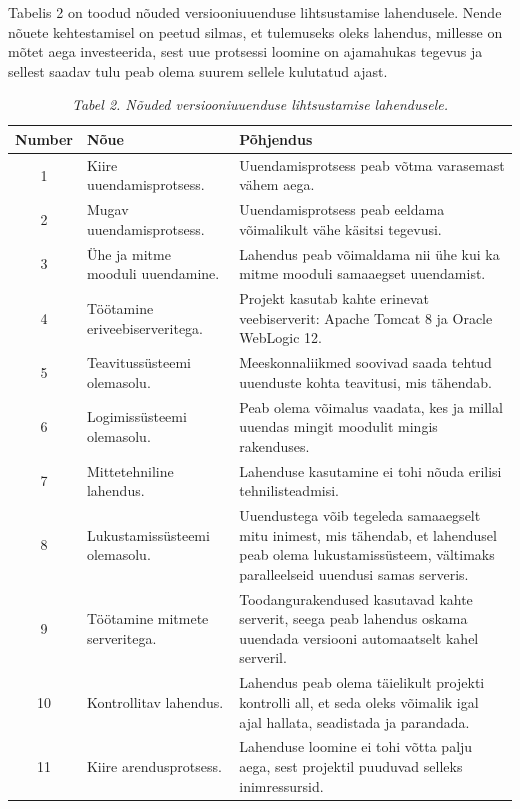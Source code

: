 \documentclass[12pt]{article}
\begin{document}
  Tabelis 2 on toodud nõuded versiooniuuenduse lihtsustamise lahendusele. Nende nõuete kehtestamisel on peetud silmas, et tulemuseks oleks lahendus, millesse on mõtet aega investeerida, sest uue protsessi loomine on ajamahukas tegevus ja sellest saadav tulu peab olema suurem sellele kulutatud ajast.
  
  \begin{table}[H]
    \caption*{\textit{Tabel 2. Nõuded versiooniuuenduse lihtsustamise lahendusele.}}
    
    \begin{tabular}{|c|p{3cm}|p{8cm}|}
      \hline
      \textbf{Number} & \textbf{Nõue} & \textbf{Põhjendus}\\
      \hline
      1 & Kiire uuendamisprotsess. & Uuendamisprotsess peab võtma varasemast vähem aega.\\
      \hline
      2 & Mugav uuendamisprotsess. & Uuendamisprotsess peab eeldama võimalikult vähe käsitsi tegevusi.\\
      \hline
      3 & Ühe ja mitme mooduli uuendamine. & Lahendus peab võimaldama nii ühe kui ka mitme mooduli samaaegset uuendamist.\\
      \hline
      4 & Töötamine eriveebiserveritega. & Projekt kasutab kahte erinevat veebiserverit: Apache Tomcat 8 ja Oracle WebLogic 12.\\
      \hline
      5 & Teavitussüsteemi olemasolu. & Meeskonnaliikmed soovivad saada tehtud uuenduste kohta teavitusi, mis tähendab.\\
      \hline
      6 & Logimissüsteemi olemasolu. & Peab olema võimalus vaadata, kes ja millal uuendas mingit moodulit mingis rakenduses.\\
      \hline
      7 & Mittetehniline lahendus. & Lahenduse kasutamine ei tohi nõuda erilisi tehnilisteadmisi.\\
      \hline
      8 & Lukustamis\-süsteemi olemasolu. & Uuendustega võib tegeleda samaaegselt mitu inimest, mis tähendab, et lahendusel peab olema lukustamissüsteem, vältimaks paralleelseid uuendusi samas serveris.\\
      \hline
      9 & Töötamine mitmete serveritega. & Toodangurakendused kasutavad kahte serverit, seega peab lahendus oskama uuendada versiooni automaatselt kahel serveril.\\
      \hline
      10 & Kontrollitav lahendus. & Lahendus peab olema täielikult projekti kontrolli all, et seda oleks võimalik igal ajal hallata, seadistada ja parandada.\\
      \hline
      11 & Kiire arendusprotsess. & Lahenduse loomine ei tohi võtta palju aega, sest projektil puuduvad selleks inimressursid.\\

\end{tabular}
\end{table}
\end{document}
